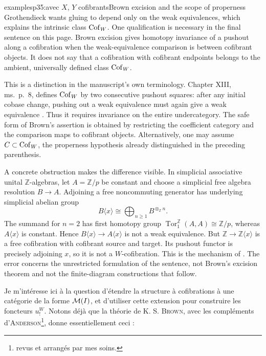 \begin{dcomment}{examples}{p35:avec $X$, $Y$ cofibrants}{Brown excision and the scope of properness}
Grothendieck wants gluing to depend only on the weak equivalences, which explains the intrinsic class $\mathrm{Cof}_W$. One qualification is necessary in the final sentence on this page. Brown excision gives homotopy invariance of a pushout along a cofibration when the weak-equivalence comparison is between cofibrant objects. It does not say that a cofibration with cofibrant endpoints belongs to the ambient, universally defined class $\mathrm{Cof}_W$.

This is a distinction in the manuscript's own terminology. Chapter XIII, ms.~p.~8, defines $\mathrm{Cof}_W$ by two consecutive pushout squares: after any initial cobase change, pushing out a weak equivalence must again give a weak equivalence \citep[Ch.~XIII, ms.~p.~8]{Grothendieck1990XIII}. Thus it requires invariance on the entire undercategory. The safe form of Brown's assertion is obtained by restricting the coefficient category and the comparison maps to cofibrant objects. Alternatively, one may assume $C\subset\mathrm{Cof}_W$, the properness hypothesis already distinguished in the preceding parenthesis.

A concrete obstruction makes the difference visible. In simplicial associative unital $\mathbb Z$-algebras, let $A=\mathbb Z/p$ be constant and choose a simplicial free algebra resolution $B\longrightarrow A$. Adjoining a free noncommuting generator has underlying simplicial abelian group
\[
 B\langle x\rangle\cong\bigoplus_{n\geq1}B^{\otimes_{\mathbb Z} n}.
\]
The summand for $n=2$ has first homotopy group
$\operatorname{Tor}^{\mathbb Z}_1(A,A)\cong\mathbb Z/p$, whereas
$A\langle x\rangle$ is constant. Hence
$B\langle x\rangle\longrightarrow A\langle x\rangle$ is not a weak equivalence. But $\mathbb Z\longrightarrow\mathbb Z\langle x\rangle$ is a free cofibration with cofibrant source and target. Its pushout functor is precisely adjoining $x$, so it is not a $W$-cofibration. This is the mechanism of \citet[Example 2.11, arXiv version]{Rezk2002Proper}. The error concerns the unrestricted formulation of the sentence, not Brown's excision theorem and not the finite-diagram constructions that follow.
\end{dcomment}


Je m'intéresse ici à la question d'étendre la structure à cofibrations à une catégorie de la forme $\mathcal{M}(I)$, et d'utiliser cette extension pour construire
les foncteurs $u^{W}_{!}$. Notons déjà que la théorie de K. S. \textsc{Brown}, avec les compléments d'\textsc{Anderson}\footnote[20]{revus et arrangés par mes soins.}, donne essentiellement ceci :

